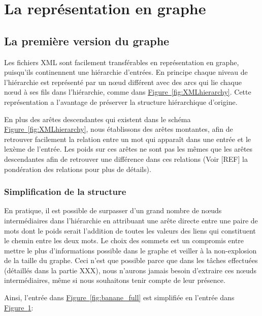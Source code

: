 \section{La représentation en graphe}


\subsection{La première version du graphe}

Les fichiers XML sont facilement transférables en représentation en graphe, 
puisqu'ils continennent une hiérarchie d'entrées. En principe chaque niveau de 
l'hiérarchie est représenté par un nœud différent avec des arcs qui lie chaque 
nœud à ses fils dans l'hiérarchie, comme dans 
\hyperref[fig:XMLhierarchy]{Figure~\ref*{fig:XMLhierarchy}}. Cette 
représentation a l'avantage de préserver la structure hiérarchique d'origine.

En plus des arêtes descendantes qui existent dans le schéma 
\hyperref[fig:XMLhierarchy]{Figure~\ref*{fig:XMLhierarchy}}, nous établissons 
des arêtes montantes, afin de retrouver facilement la relation entre un mot qui 
apparaît dans une entrée et le lexème de l'entrée. Les poids sur ces arêtes ne 
sont pas les mêmes que les arêtes descendantes afin de retrouver une différence 
dans ces relations (Voir [REF] la pondération des relations pour plus de détails).


\subsubsection{Simplification de la structure}
En pratique, il est possible de surpasser d'un grand nombre de nœuds 
intermédiaires dans l'hiérarchie en attribuant une arête directe entre une paire 
de mots dont le poids serait l'addition de toutes les valeurs des liens qui 
constituent le chemin entre les deux mots. Le choix des sommets est un compromis 
entre mettre le plus d'informations possible dans le graphe et veiller à la 
non-explosion de la taille du graphe. Ceci n'est que possible parce que dans les 
tâches effectuées (détaillés dans la partie XXX), nous n'aurons jamais besoin 
d'extraire ces nœuds intermédiaires, même si nous souhaitons tenir compte de 
leur présence.

Ainsi, l'entrée dans \hyperref[fig:banane_full]{Figure~\ref*{fig:banane_full}} 
est simplifiée en l'entrée dans 
\hyperref[fig:banane_simple]{Figure~\ref*{fig:banane_simple}}:

\begin{figure}
\centering
\parbox{5cm}{
\def\svgscale{0.5}

\caption{}
\label{fig:banane_full}}
\qquad
\begin{minipage}{5cm}
\def\svgscale{0.5}

\caption{}
\label{fig:banane_simple}
\end{minipage}
\end{figure}

